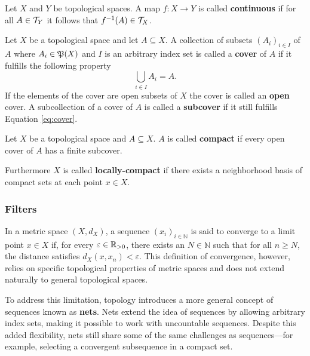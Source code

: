\begin{defin}
  Let $X$ and $Y$ be topological spaces. A map $f\colon X \to Y$ is called \textbf{continuous} if for all $A \in \mathcal{T}_Y$ it follows that $f^{-1}(A) \in \mathcal{T}_X$.  
\end{defin}

\begin{defin}
  Let $X$ be a topological space and let $A \subseteq X$. A collection of subsets $(A_i)_{i\in I}$ of $A$ where $A_i \in \mathfrak{P}(X)$ and $I$ is an arbitrary index set is called a \textbf{cover} of $A$ if it fulfills the following property
  \begin{equation}\label{eq:cover}
    \bigcup\limits_{i\in I}A_i = A.
  \end{equation}
  If the elements of the cover are open subsets of $X$ the cover is called an \textbf{open} cover.
  A subcollection of a cover of $A$ is called a \textbf{subcover} if it still fulfills Equation \ref{eq:cover}.
\end{defin}

\begin{defin}
  Let $X$ be a topological space and $A \subseteq X$. $A$ is called \textbf{compact} if every open cover of $A$ has a finite subcover. 

  Furthermore $X$ is called \textbf{locally-compact} if there exists a neighborhood basis of compact sets at each point $x \in X$. 
\end{defin}

\subsubsection{Filters}
In a metric space \((X, d_X)\), a sequence \((x_i)_{i \in \mathbb{N}}\) is said to converge to a limit point \(x \in X\) if, for every \(\varepsilon \in \mathbb{R}_{>0}\), there exists an \(N \in \mathbb{N}\) such that for all \(n \geq N\), the distance satisfies \(d_X(x, x_n) < \varepsilon\). This definition of convergence, however, relies on specific topological properties of metric spaces and does not extend naturally to general topological spaces. 

To address this limitation, topology introduces a more general concept of sequences known as \textbf{nets}. Nets extend the idea of sequences by allowing arbitrary index sets, making it possible to work with uncountable sequences. Despite this added flexibility, nets still share some of the same challenges as sequences—for example, selecting a convergent subsequence in a compact set.

